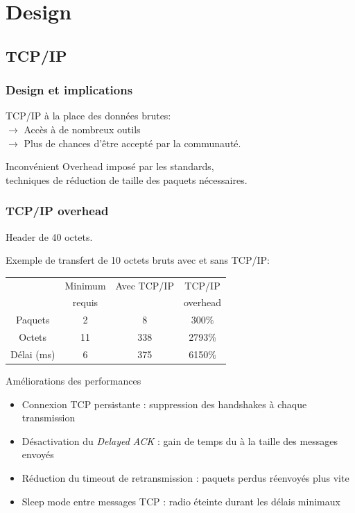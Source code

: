 \section{Design}
\subsection{TCP/IP}
\begin{frame}
 \frametitle{Design et implications}
 TCP/IP à la place des données brutes:\\
 \vspace{5mm}
 \textbf{$\rightarrow$} Accès à de nombreux outils\\
 \textbf{$\rightarrow$} Plus de chances d'être accepté par la communauté.\\
 \vspace{5mm}
\begin{block}{Inconvénient}
Overhead imposé par les standards,\\
techniques de réduction de taille des paquets nécessaires.
\end{block}
 
\end{frame}
\begin{frame}
\frametitle{TCP/IP overhead}
\begin{center}
 \alert{Header de 40 octets.}
\end{center}
\vspace{5mm}
Exemple de transfert de 10 octets bruts avec et sans TCP/IP: \\
\begin{center}
\begin{tabular}{|c|c|c|c|}
\hline
~ & Minimum & Avec TCP/IP & TCP/IP\\
~ & requis & ~ & overhead\\
\hline
Paquets & 2 & 8 & 300\% \\
Octets & 11 & 338 & 2793\% \\
Délai (ms) & 6 & 375 & 6150\% \\
\hline
\end{tabular}
\end{center}
\end{frame}

\begin{frame}{Améliorations des performances}
\begin{itemize}
\item Connexion TCP persistante : suppression des handshakes à chaque transmission
\item Désactivation du \textit{Delayed ACK} : gain de temps du à la taille des messages envoyés
\item Réduction du timeout de retransmission : paquets perdus réenvoyés plus vite
\item Sleep mode entre messages TCP : radio éteinte durant les délais minimaux
\end{itemize}
\end{frame}

